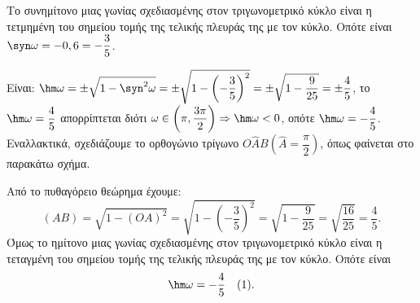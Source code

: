 \begin{alist}
\item Το συνημίτονο μιας γωνίας σχεδιασμένης στον τριγωνομετρικό κύκλο είναι η τετμημένη του σημείου τομής της τελικής πλευράς της με τον κύκλο. Οπότε είναι $\syn \omega = -0,6 = -\dfrac{3}{5}$.
\item
\begin{rlist}
\item Είναι: $\hm \omega = \pm\sqrt{1-\syn ^2\omega} = \pm\sqrt{1-\left(-\dfrac{3}{5}\right)^2} = \pm\sqrt{1-\dfrac{9}{25}} = \pm\dfrac{4}{5}$, το $\hm \omega = \dfrac{4}{5}$ απορρίπτεται διότι $\omega \in \left(\pi, \dfrac{3\pi}{2}\right) \Rightarrow \hm \omega < 0$, οπότε $\hm \omega = -\dfrac{4}{5}$.
Εναλλακτικά, σχεδιάζουμε το ορθογώνιο τρίγωνο $O\hat{A}B \left(\hat{A}=\dfrac{\pi}{2}\right)$, όπως φαίνεται στο παρακάτω σχήμα.
\begin{center}
\end{center}
Από το πυθαγόρειο θεώρημα έχουμε:
\[(AB) = \sqrt{1-(OA)^2} = \sqrt{1-\left(-\frac{3}{5}\right)^2} = \sqrt{1-\frac{9}{25}} = \sqrt{\frac{16}{25}} = \frac{4}{5}.\]
Όμως το ημίτονο μιας γωνίας σχεδιασμένης στον τριγωνομετρικό κύκλο είναι η τεταγμένη του σημείου τομής της τελικής πλευράς της με τον κύκλο. Οπότε είναι
\[\hm \omega = -\frac{4}{5} \quad (1).\]
\end{rlist}
\end{alist}

